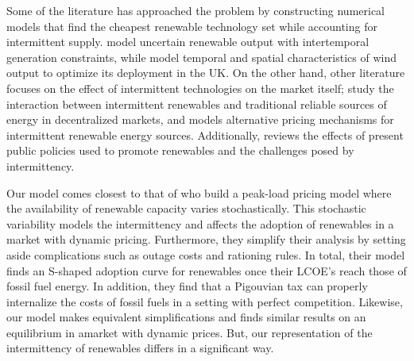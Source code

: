 \documentclass[11pt,a4paper]{extarticle}
\begin{document}
Some of the literature has approached the problem by constructing numerical models that find the cheapest renewable technology set while accounting for intermittent supply. \citet{MN2006} model uncertain renewable output with intertemporal generation constraints, while \citet{NCK2007} model temporal and spatial characteristics of wind output to optimize its deployment in the UK. On the other hand, other literature focuses on the effect of intermittent technologies on the market itself; \citet{AC2012} study the interaction between intermittent renewables and traditional reliable sources of energy in decentralized markets, and \citet{Chao2011} models alternative pricing mechanisms for intermittent renewable energy sources. Additionally, \citet{Boren2012} reviews the effects of present public policies used to promote renewables and the challenges posed by intermittency. 

Our model comes closest to that of \citet{HH} who build a peak-load pricing model where the availability of renewable capacity varies stochastically. This stochastic variability models the intermittency and affects the adoption of renewables in a market with dynamic pricing. Furthermore, they simplify their analysis by setting aside complications such as  outage costs and rationing rules. In total, their model finds an S-shaped adoption curve for renewables once their LCOE's reach those of fossil fuel energy. In addition, they find that a Pigouvian tax can properly internalize the costs of fossil fuels in a setting with perfect competition. Likewise, our model makes equivalent simplifications and finds similar results on an equilibrium in  amarket with dynamic prices. But, our representation of the intermittency of renewables differs in a significant way. 
\end{document}
